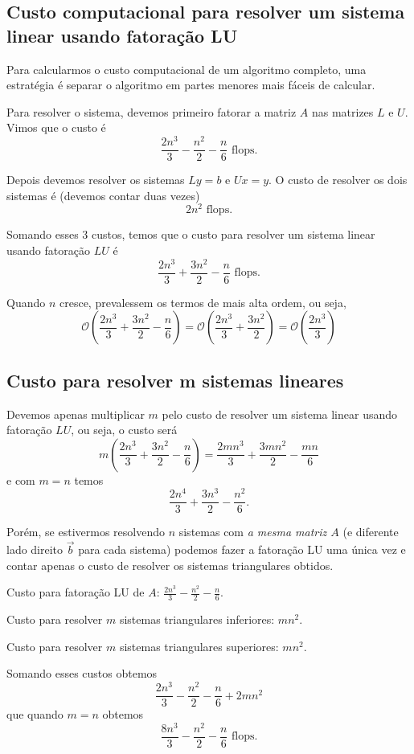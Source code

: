 \subsection{Custo computacional para resolver um sistema linear usando fatoração LU}
Para calcularmos o custo computacional de um algoritmo completo, uma estratégia é separar o algoritmo em partes menores mais fáceis de calcular.

Para resolver o sistema, devemos primeiro fatorar a matriz $A$ nas matrizes $L$ e $U$. Vimos que o custo é
$$\frac{2n^3}{3}-\frac{n^2}{2}-\frac{n}{6} \text{~flops}.$$

Depois devemos resolver os sistemas $Ly=b$ e $Ux=y$. O custo de resolver os dois sistemas é  (devemos contar duas vezes)
$$ 2 n^2\text{~flops}.$$

Somando esses $3$ custos, temos que o custo para resolver um sistema linear usando fatoração $LU$ é 
$$\frac{2n^3}{3}+\frac{3n^2}{2}-\frac{n}{6} \text{~flops}.$$

Quando $n$ cresce, prevalessem os termos de mais alta ordem, ou seja,
$$\mathcal{O}(\frac{2n^3}{3}+\frac{3n^2}{2}-\frac{n}{6}) = \mathcal{O}(\frac{2n^3}{3}+\frac{3n^2}{2})=\mathcal{O}(\frac{2n^3}{3})$$

\subsection{Custo para resolver m sistemas lineares}
Devemos apenas multiplicar $m$ pelo custo de resolver um sistema linear usando fatoração $LU$, ou seja, o custo será 
$$m(\frac{2n^3}{3}+\frac{3n^2}{2}-\frac{n}{6})=\frac{2mn^3}{3}+\frac{3mn^2}{2}-\frac{mn}{6}$$
e com $m=n$ temos
$$\frac{2n^4}{3}+\frac{3n^3}{2}-\frac{n^2}{6}.$$

Porém, se estivermos resolvendo $n$ sistemas com \textit{a mesma matriz $A$ }(e diferente lado direito $\vec b$ para cada sistema) podemos fazer a fatoração LU uma única vez e contar apenas o custo de resolver os sistemas triangulares obtidos.

Custo para fatoração LU de $A$: $\frac{2n^3}{3}-\frac{n^2}{2}-\frac{n}{6}$.

Custo para resolver $m$ sistemas triangulares inferiores: $m n^2 $.

Custo para resolver $m$ sistemas triangulares superiores: $m n^2 $.

Somando esses custos obtemos
$$\frac{2n^3}{3}-\frac{n^2}{2}-\frac{n}{6}+2m n^2 $$
que quando $m=n$ obtemos
$$\frac{8n^3}{3}-\frac{n^2}{2}-\frac{n}{6} \text{~flops}.$$

